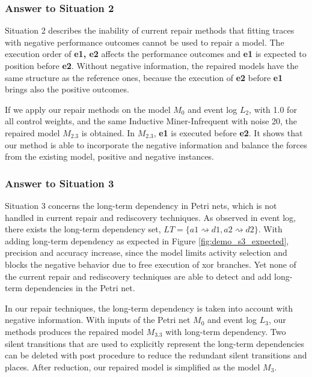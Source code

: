 \subsubsection{Answer to Situation 2}
Situation 2 describes the inability of current repair methods that fitting traces with negative performance outcomes cannot be used to repair a model. 
The execution order of \textbf{e1, e2} affects the performance outcomes and \textbf{e1} is expected to position before \textbf{e2}. Without negative information, the repaired models have the same structure as the reference ones, because the execution of \textbf{e2} before \textbf{e1} brings also the positive outcomes. 

If we apply our repair methods on the model $M_0$ and event log $L_2$, with 1.0 for all control weights, and the same Inductive Miner-Infrequent with noise 20, the repaired model $M_{2.3}$ is obtained. In $M_{2.3}$, \textbf{e1} is executed before \textbf{e2}. It shows that our method is able to incorporate the negative information and balance the forces from the existing model, positive and negative instances. 

\subsubsection{Answer to Situation 3}
Situation 3 concerns the long-term dependency in Petri nets, which is not handled in current repair and rediscovery techniques. As observed in event log, there exists the long-term dependency set, $LT=\{ a1\rightsquigarrow d1, a2\rightsquigarrow d2\}$.  With adding long-term dependency as expected in Figure \ref{fig:demo_s3_expected}, precision and accuracy increase, since the model limits activity selection and blocks the negative behavior due to free execution of xor branches. Yet none of the current repair  and rediscovery techniques are able to detect and add long-term dependencies in the Petri net. 

In our repair techniques, the long-term dependency is taken into account with negative information. With inputs of the Petri net $M_0$ and event log $L_3$, our methods produces the repaired model $M_{3.3}$ with long-term dependency. Two silent transitions that are used to explicitly represent the long-term dependencies can be deleted with post procedure to reduce the redundant silent transitions and places. After reduction, our repaired model is simplified as the model $M_{3}$. 
